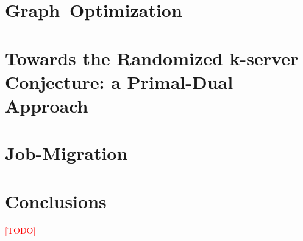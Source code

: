 \documentclass[10pt, twocolumn]{article}
\newcommand{\fred}[1]{%
	\textcolor{red}{[#1]}
}
\begin{document}
\section{\mbox{Graph Optimization}}
\label{steiner-tree}


\section{Towards the Randomized k-server Conjecture: a Primal-Dual Approach}
\label{k-server}


\section{Job-Migration}
\label{job-migration}


\section{Conclusions}
\fred{TODO}



\end{document}
